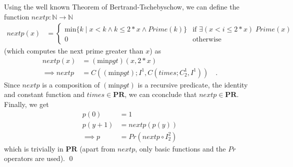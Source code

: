 \documentclass [11pt]{article}
\newcommand{\PR}{\textbf{PR}}
\begin{document}
\noindent
Using the well known Theorem of Bertrand-Tschebyschow, we can define the function $nextp: \mathbb{N} \rightarrow \mathbb{N}$
\begin{align*}
nextp(x) &= 
\begin{cases}
  \text{min}\{k \mid x < k \land k \leq 2*x \land Prime(k) \} & \text{if }\exists(x < i \leq 2*x)\; Prime(x)\\
  0 & \text{otherwise}
\end{cases}
\end{align*}
(which computes the next prime greater than $x$) as
\begin{align*}
nextp(x) &= (\text{min}pgt)(x, 2*x)\\
\implies nextp &= C((\text{min}pgt); I^1, C(times; C^1_2, I^1)) \quad .
\end{align*}
Since $nextp$ is a composition of $(\text{min}pgt)$ is a recursive predicate, the identity and constant function and $times \in \PR$, we can cconclude that $nextp \in \PR$.
Finally, we get 
\begin{align*}
p(0) &= 1 \\
p(y+1) &= nextp(p(y)) \\
\implies p &=  Pr(nextp \circ I^2_2)
\end{align*}
which is trivially in $\PR$ (apart from $nextp$, only basic functions and the $Pr$ operators are used).
\qed
\end{document}
